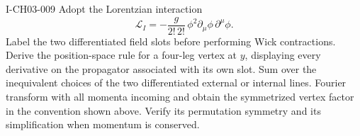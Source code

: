 \begin{exercise}{I-CH03-009}
Adopt the Lorentzian interaction
\[
 \mathcal L_I=-\frac{g}{2!\,2!}\,
 \phi^2\partial_\mu\phi\,\partial^\mu\phi.
\]
Label the two differentiated field slots before performing Wick contractions.
Derive the position-space rule for a four-leg vertex at $y$, displaying every
derivative on the propagator associated with its own slot.  Sum over the
inequivalent choices of the two differentiated external or internal lines.
Fourier transform with all momenta incoming and obtain the symmetrized vertex
factor in the convention shown above.  Verify its permutation symmetry and
its simplification when momentum is conserved.
\end{exercise}
